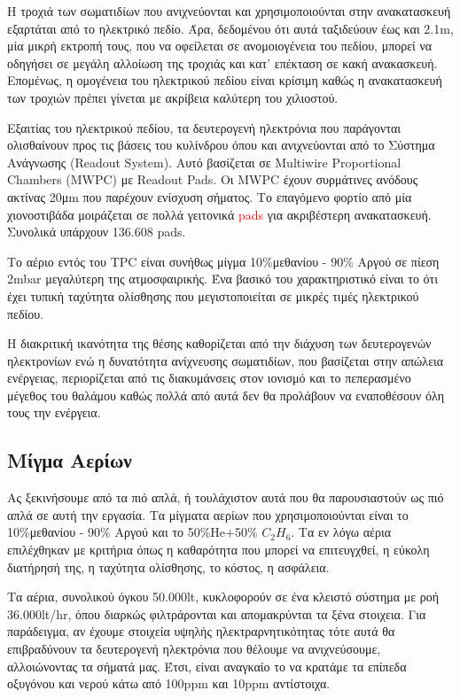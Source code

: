 	 Η τροχιά των σωματιδίων που ανιχνεύονται και χρησιμοποιούνται στην ανακατασκευή εξαρτάται από το ηλεκτρικό πεδίο. Άρα, δεδομένου ότι αυτά ταξιδεύουν έως και 2.1m, μία μικρή εκτροπή τους, που να οφείλεται σε ανομοιογένεια του πεδίου, μπορεί να οδηγήσει σε μεγάλη αλλοίωση της τροχιάς και κατ' επέκταση σε κακή ανακασκευή.
	Επομένως, η ομογένεια του ηλεκτρικού πεδίου είναι κρίσιμη καθώς η ανακατασκευή των τροχιών πρέπει γίνεται με ακρίβεια καλύτερη του χιλιοστού.
	
	Εξαιτίας του ηλεκτρικού πεδίου, τα δευτερογενή ηλεκτρόνια που παράγονται ολισθαίνουν προς τις βάσεις του κυλίνδρου όπου και ανιχνεύονται από το Σύστημα Ανάγνωσης (Readout System). 
	Αυτό βασίζεται σε Multiwire Proportional Chambers (MWPC) με Readout Pads. Oι MWPC έχουν συρμάτινες ανόδους ακτίνας 20μm που παρέχουν ενίσχυση σήματος. Το επαγόμενο φορτίο από μία χιονοστιβάδα μοιράζεται σε πολλά γειτονικά \textcolor{red}{pads} για ακριβέστερη ανακατασκευή.  Συνολικά υπάρχουν 136.608 pads.
	
	Το αέριο εντός του TPC είναι συνήθως μίγμα 10\%μεθανίου - 90\% Αργού σε πίεση 2mbar μεγαλύτερη της ατμοσφαιρικής. Ένα βασικό του χαρακτηριστικό είναι το ότι έχει τυπική ταχύτητα ολίσθησης που μεγιστοποιείται σε μικρές τιμές ηλεκτρικού πεδίου.
	
	Η διακριτική ικανότητα της θέσης καθορίζεται από την διάχυση των δευτερογενών ηλεκτρονίων ενώ η δυνατότητα ανίχνευσης σωματιδίων, που βασίζεται στην απώλεια ενέργειας, περιορίζεται από τις διακυμάνσεις στον ιονισμό και το πεπερασμένο μέγεθος του θαλάμου καθώς πολλά από αυτά δεν θα προλάβουν να εναποθέσουν όλη τους την ενέργεια.
	
\subsection{Μίγμα Αερίων}
	Ας ξεκινήσουμε από τα πιό απλά, ή τουλάχιστον αυτά που θα παρουσιαστούν ως πιό απλά σε αυτή την εργασία. Τα μίγματα αερίων που χρησιμοποιούνται είναι το 10\%μεθανίου - 90\% Αργού και το 50\%He+50\% $C_2H_6$. Τα εν λόγω αέρια επιλέχθηκαν με κριτήρια όπως η καθαρότητα που μπορεί να επιτευγχθεί, η εύκολη διατήρησή της, η ταχύτητα ολίσθησης, το κόστος, η ασφάλεια.
	
	Τα αέρια, συνολικού όγκου 50.000lt, κυκλοφορούν σε ένα κλειστό σύστημα με ροή 36.000lt/hr, όπου διαρκώς φιλτράρονται και απομακρύνται τα ξένα στοιχεια. Για παράδειγμα, αν έχουμε στοιχεία υψηλής ηλεκτραρνητικότητας τότε αυτά θα επιβραδύνουν τα δευτερογενή ηλεκτρόνια που θέλουμε να ανιχνεύσουμε, αλλοιώνοντας τα σήματά μας. Έτσι, είναι αναγκαίο το να κρατάμε τα επίπεδα οξυγόνου και νερού κάτω από 100ppm και 10ppm  αντίστοιχα. 	
	
